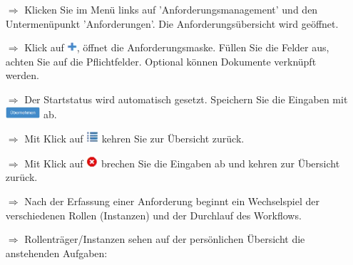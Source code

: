 \documentclass{article}
\begin{document}
\begin{multicols}{2}

\begin{tcolorbox}[colback=blue!5,colframe=blue!40!black,title=Anforderung erfassen]
\begin{itemize}
  \item[$\Longrightarrow$] Klicken Sie im Menü links auf 'Anforderungsmanagement' und den Untermenüpunkt 'Anforderungen'. Die Anforderungsübersicht wird geöffnet.
  \item[$\Longrightarrow$] Klick auf \includegraphics[height=10pt]{Icons/Pluszeichen.png}, öffnet die Anforderungsmaske. Füllen Sie die Felder aus, achten Sie auf die Pflichtfelder. Optional können Dokumente verknüpft werden.
  \item[$\Longrightarrow$] Der Startstatus wird automatisch gesetzt. Speichern Sie die Eingaben mit \includegraphics[height=12pt]{Icons/B_Uebernehmen.jpg} ab.
	\item[$\Longrightarrow$] Mit Klick auf \includegraphics[height=12pt]{Icons/Listensymbol_zurueck.png} kehren Sie zur Übersicht zurück.
	\item[$\Longrightarrow$] Mit Klick auf \includegraphics[height=12pt]{Icons/Abbrechen_r.png} brechen Sie die Eingaben ab und kehren zur Übersicht zurück.
\end{itemize}
\end{tcolorbox}

\begin{tcolorbox}[colback=blue!5,colframe=blue!40!black,title={Anforderungen managen}]
\begin{itemize}
  \item[$\Longrightarrow$] Nach der Erfassung einer Anforderung beginnt ein Wechselspiel der verschiedenen Rollen (Instanzen) und der Durchlauf des Workflows.
  \item[$\Longrightarrow$] Rollenträger/Instanzen sehen auf der persönlichen Übersicht die anstehenden Aufgaben:

\begin{centering}
\end{centering}


\end{itemize}
\end{tcolorbox}
\end{multicols}
\end{document}
